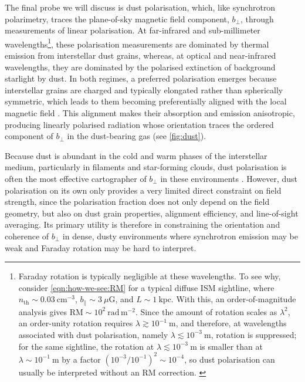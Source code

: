 The final probe we will discuss is dust polarisation, which, like synchrotron polarimetry, traces the plane-of-sky magnetic field component, $b_\perp$, through measurements of linear polarisation. At far-infrared and sub-millimeter wavelengths\footnote{
    Faraday rotation is typically negligible at these wavelengths. To see why, consider \autoref{eqn:how-we-see:RM} for a typical diffuse ISM sightline, where $n_\mathrm{th}\sim 0.03~\mathrm{cm^{-3}}$, $b_\parallel\sim 3~\mu\mathrm{G}$, and $L\sim 1~\mathrm{kpc}$. With this, an order-of-magnitude analysis gives $\mathrm{RM}\sim 10^2~\mathrm{rad\,m^{-2}}$. Since the amount of rotation scales as $\lambda^2$, an order-unity rotation requires $\lambda \gtrsim 10^{-1}~\mathrm{m}$, and therefore, at wavelengths associated with dust polarisation, namely $\lambda \lesssim 10^{-3}~\mathrm{m}$, rotation is suppressed; for the same sightline, the rotation at $\lambda\lesssim 10^{-3}~\mathrm{m}$ is smaller than at $\lambda\sim 10^{-1}~\mathrm{m}$ by a factor $\left(10^{-3}/10^{-1}\right)^2 \sim 10^{-4}$, so dust polarisation can usually be interpreted without an $\mathrm{RM}$ correction.
    \label{fnote:faraday}
}, these polarisation measurements are dominated by thermal emission from interstellar dust grains, whereas, at optical and near-infrared wavelengths, they are dominated by the polarised extinction of background starlight by dust. In both regimes, a preferred polarisation emerges because interstellar grains are charged and typically elongated rather than spherically symmetric, which leads to them becoming preferentially aligned with the local magnetic field \citep{andersson2015interstellar}. This alignment makes their absorption and emission anisotropic, producing linearly polarised radiation whose orientation traces the ordered component of $b_\perp$ in the dust-bearing gas (see \autoref{fig:dust}).

Because dust is abundant in the cold and warm phases of the interstellar medium, particularly in filaments and star-forming clouds, dust polarisation is often the most effective cartographer of $b_\perp$ in these environments \citep{collaboration2015planck}. However, dust polarisation on its own only provides a very limited direct constraint on field strength, since the polarisation fraction does not only depend on the field geometry, but also on dust grain properties, alignment efficiency, and line-of-sight averaging. Its primary utility is therefore in constraining the orientation and coherence of $b_\perp$ in dense, dusty environments where synchrotron emission may be weak and Faraday rotation may be hard to interpret.

